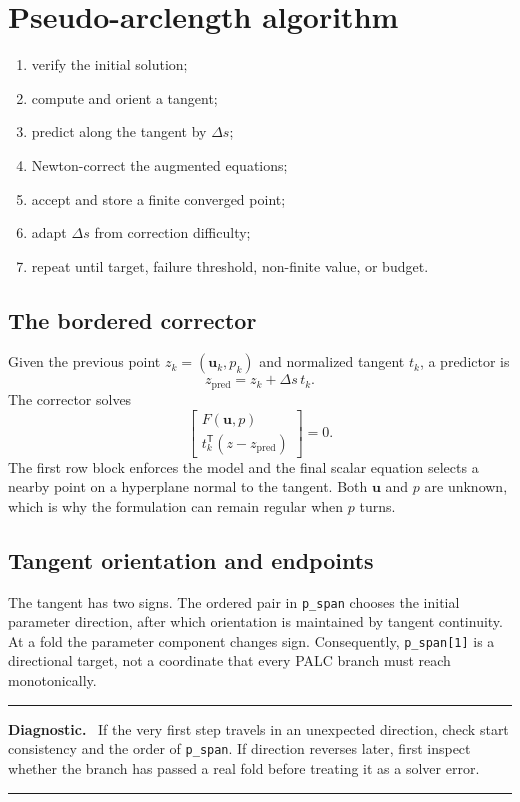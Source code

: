 \documentclass[11pt,oneside]{book}
\newcommand{\state}{\bm{u}}
\newenvironment{diagnosticbox}
  {\par\medskip\noindent\begin{minipage}{\textwidth}
   \color{JaxOrange!90!black}\rule{\textwidth}{0.8pt}\par
   \textbf{Diagnostic.}\ \color{black}}
  {\par\color{JaxOrange!90!black}\rule{\textwidth}{0.8pt}
   \end{minipage}\par\medskip}
\begin{document}
\chapter{Pseudo-arclength algorithm}

\begin{enumerate}
  \item verify the initial solution;
  \item compute and orient a tangent;
  \item predict along the tangent by $\Delta s$;
  \item Newton-correct the augmented equations;
  \item accept and store a finite converged point;
  \item adapt $\Delta s$ from correction difficulty;
  \item repeat until target, failure threshold, non-finite value, or budget.
\end{enumerate}

\section{The bordered corrector}

Given the previous point $z_k=(\state_k,p_k)$ and normalized tangent $t_k$, a
predictor is
\[
  z_{\mathrm{pred}}=z_k+\Delta s\,t_k.
\]
The corrector solves
\[
  \begin{bmatrix}
    F(\state,p)\\
    t_k^\mathsf{T}(z-z_{\mathrm{pred}})
  \end{bmatrix}=0.
\]
The first row block enforces the model and the final scalar equation selects a
nearby point on a hyperplane normal to the tangent. Both $\state$ and $p$ are
unknown, which is why the formulation can remain regular when $p$ turns.

\section{Tangent orientation and endpoints}

The tangent has two signs. The ordered pair in \texttt{p\_span} chooses the
initial parameter direction, after which orientation is maintained by tangent
continuity. At a fold the parameter component changes sign. Consequently,
\texttt{p\_span[1]} is a directional target, not a coordinate that every PALC
branch must reach monotonically.

\begin{diagnosticbox}
If the very first step travels in an unexpected direction, check start
consistency and the order of \texttt{p\_span}. If direction reverses later,
first inspect whether the branch has passed a real fold before treating it as
a solver error.
\end{diagnosticbox}
\end{document}
